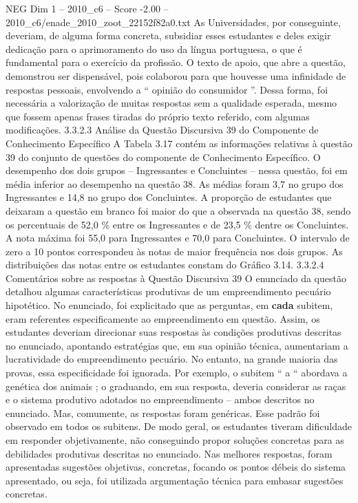 \begin{textsample}{NEG Dim 1 – 2010\_c6 – Score -2.00 – 2010\_c6/enade\_2010\_zoot\_22152f82a0.txt}
As Universidades, por conseguinte, deveriam, de alguma forma concreta, subsidiar esses estudantes e deles exigir dedicação para o aprimoramento do uso da língua portuguesa, o que é fundamental para o exercício da profissão.
O texto de apoio, que abre a questão, demonstrou ser dispensável, pois colaborou para que houvesse uma infinidade de respostas pessoais, envolvendo a “ opinião do consumidor ”.
Dessa forma, foi necessária a valorização de muitas respostas sem a qualidade esperada, mesmo que fossem apenas frases tiradas do próprio texto referido, com algumas modificações. 3.3.2.3 Análise da Questão Discursiva 39 do Componente de Conhecimento Específico A Tabela 3.17 contém as informações relativas à questão 39 do conjunto de questões do componente de Conhecimento Específico.
O desempenho dos dois grupos – Ingressantes e Concluintes – nessa questão, foi em média inferior ao desempenho na questão 38.
As médias foram 3,7 no grupo dos Ingressantes e 14,8 no grupo dos Concluintes.
A proporção de estudantes que deixaram a questão em branco foi maior do que a observada na questão 38, sendo os percentuais de 52,0 \% entre os Ingressantes e de 23,5 \% dentre os Concluintes.
A nota máxima foi 55,0 para Ingressantes e 70,0 para Concluintes.
O intervalo de zero a 10 pontos correspondeu às notas de maior frequência nos dois grupos.
As distribuições das notas entre os estudantes constam do Gráfico 3.14. 3.3.2.4 Comentários sobre as respostas à Questão Discursiva 39 O enunciado da questão detalhou algumas características produtivas de um empreendimento pecuário hipotético.
No enunciado, foi explicitado que as perguntas, em \textbf{cada} subitem, eram referentes especificamente ao empreendimento em questão.
Assim, os estudantes deveriam direcionar suas respostas às condições produtivas descritas no enunciado, apontando estratégias que, em sua opinião técnica, aumentariam a lucratividade do empreendimento pecuário.
No entanto, na grande maioria das provas, essa especificidade foi ignorada.
Por exemplo, o subitem “ a “ abordava a genética dos animais ; o graduando, em sua resposta, deveria considerar as raças e o sistema produtivo adotados no empreendimento – ambos descritos no enunciado.
Mas, comumente, as respostas foram genéricas.
Esse padrão foi observado em todos os subitens.
De modo geral, os estudantes tiveram dificuldade em responder objetivamente, não conseguindo propor soluções concretas para as debilidades produtivas descritas no enunciado.
Nas melhores respostas, foram apresentadas sugestões objetivas, concretas, focando os pontos débeis do sistema apresentado, ou seja, foi utilizada argumentação técnica para embasar sugestões concretas.

\end{textsample}
